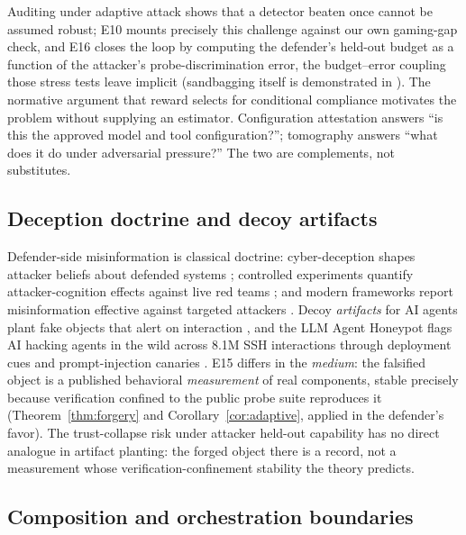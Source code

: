 Auditing under adaptive attack
\cite{soopal2026,duddu2026,tice2025,auditinggames2025} shows that a detector
beaten once cannot be assumed robust; E10 mounts precisely this challenge
against our own gaming-gap check, and E16 closes the loop by computing the
defender's held-out budget as a function of the attacker's
probe-discrimination error, the budget--error coupling those stress tests
leave implicit (sandbagging itself is demonstrated in
\cite{aisandbagging2025}). The normative argument that reward selects for
conditional compliance \cite{baum2026} motivates the problem without
supplying an estimator. Configuration attestation \cite{ati2026} answers
``is this the approved model and tool configuration?''; tomography answers
``what does it do under adversarial pressure?'' The two are complements,
not substitutes.

\subsection{Deception doctrine and decoy artifacts}

Defender-side misinformation is classical doctrine: cyber-deception shapes
attacker beliefs about defended systems \cite{bodeau2013}; controlled
experiments quantify attacker-cognition effects against live red teams
\cite{tularosa2019,fergusonwalter2017}; and modern frameworks report
misinformation effective against targeted attackers \cite{perry2025}.
Decoy \emph{artifacts} for AI agents plant fake objects that alert on
interaction \cite{honeypotagents2026}, and the LLM Agent Honeypot flags AI
hacking agents in the wild across 8.1M SSH interactions through deployment
cues
and prompt-injection canaries \cite{volkov2024}. E15 differs in the
\emph{medium}: the falsified object is a published behavioral
\emph{measurement} of real components, stable precisely because verification
confined to the public probe suite reproduces it (Theorem~\ref{thm:forgery}
and Corollary~\ref{cor:adaptive}, applied in the defender's favor). The trust-collapse
risk under attacker held-out capability has no direct analogue in artifact
planting: the forged object there is a record, not a measurement whose
verification-confinement stability the theory predicts.

\subsection{Composition and orchestration boundaries}

